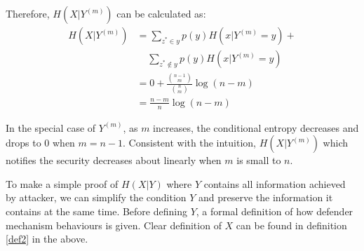 \documentclass[10pt, conference, compsocconf]{IEEEtran}
\begin{document}
        Therefore, $H(X | Y^{(m)})$ can be calculated as:
        \begin{align*}
            H(X | Y^{(m)}) %
                &= \sum_{z^* \in y} p(y) H(x | Y^{(m)} = y) + \\
                    & \;\;\;\; \sum_{z^* \notin y} p(y) H(x | Y^{(m)} = y)\\
                &= 0+\frac{\binom{n-1}{m}}{\binom{n}{m}} \log(n-m)\\
                &= \frac{n-m}{n} \log(n-m)
        \end{align*}

        In the special case of $Y^{(m)}$, as $m$ increases,
        the conditional entropy decreases and drops to $0$ when $m = n-1$.
        Consistent with the intuition, $H(X | Y^{(m)})$ which notifies the security decreases about linearly when $m$ is small
        to $n$.

        To make a simple proof of $H(X | Y)$ where $Y$ contains
        all information achieved by attacker, we can simplify the
        condition $Y$ and preserve the information it contains
        at the same time. Before defining $Y$, a
        formal definition of how defender mechanism behaviours is given. Clear
        definition of $X$ can be found in definition \ref{def2} in the above.
\end{document}
